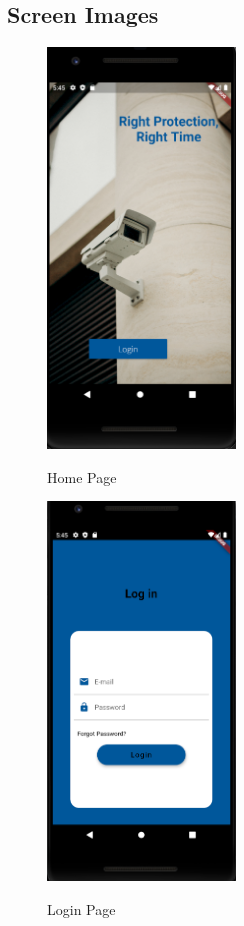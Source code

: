 \documentclass[12pt]{article}
\begin{document}
\subsection {Screen Images}
\FloatBarrier
\begin{figure}[h]
  \centering
  \includegraphics[width=5cm]{HomePage.PNG}
  \label{fig:2}
   \caption{Home Page}
\end{figure}
\FloatBarrier
\begin{figure}[h]
  \centering
  \includegraphics[width=5cm]{Login.PNG}
  \label{fig:2}
   \caption{Login Page}
\end{figure}
\FloatBarrier
\end{document}
